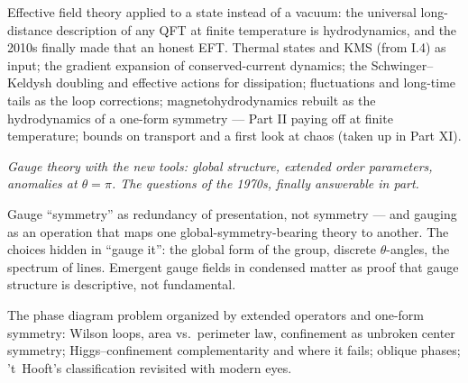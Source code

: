 Effective field theory applied to a state instead of a vacuum: the universal long-distance description of any QFT at finite temperature is hydrodynamics, and the 2010s finally made that an honest EFT. Thermal states and KMS (from I.4) as input; the gradient expansion of conserved-current dynamics; the Schwinger--Keldysh doubling and effective actions for dissipation; fluctuations and long-time tails as the loop corrections; magnetohydrodynamics rebuilt as the hydrodynamics of a one-form symmetry --- Part II paying off at finite temperature; bounds on transport and a first look at chaos (taken up in Part XI).


\noin \emph{Gauge theory with the new tools: global structure, extended order parameters, anomalies at $\theta=\pi$. The questions of the 1970s, finally answerable in part.}

Gauge ``symmetry'' as redundancy of presentation, not symmetry --- and gauging as an operation that maps one global-symmetry-bearing theory to another. The choices hidden in ``gauge it'': the global form of the group, discrete $\theta$-angles, the spectrum of lines. Emergent gauge fields in condensed matter as proof that gauge structure is descriptive, not fundamental.

The phase diagram problem organized by extended operators and one-form symmetry: Wilson loops, area vs.\ perimeter law, confinement as unbroken center symmetry; Higgs--confinement complementarity and where it fails; oblique phases; 't~Hooft's classification revisited with modern eyes.

